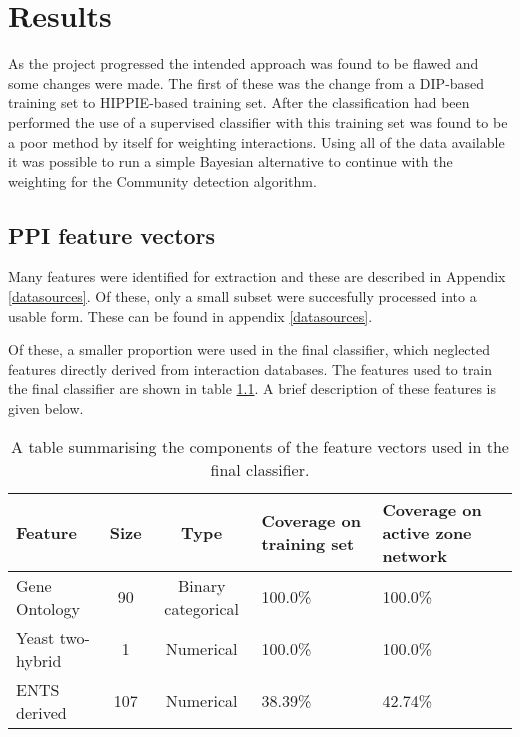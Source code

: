 \chapter{Results}
\label{results}


As the project progressed the intended approach was found to be flawed and some changes were made.
The first of these was the change from a \ac{DIP}-based training set to \ac{HIPPIE}-based training set.
After the classification had been performed the use of a supervised classifier with this training set was found to be a poor method by itself for weighting interactions.
Using all of the data available it was possible to run a simple Bayesian alternative to continue with the weighting for the Community detection algorithm.

\section{\ac{PPI} feature vectors}

Many features were identified for extraction and these are described in Appendix \ref{datasources}.
Of these, only a small subset were succesfully processed into a usable form.
These can be found in appendix \ref{datasources}.

Of these, a smaller proportion were used in the final classifier, which neglected features directly derived from interaction databases.
The features used to train the final classifier are shown in table \ref{tab:features}.
A brief description of these features is given below.

\begin{table}
    \centering
    \small
    \begin{tabular}{l c c p{} p{}}
        Feature         &   Size &  Type                &  Coverage on training set &  Coverage on active zone network \\
        \hline
        Gene Ontology    &  90   &  Binary categorical  &  100.0\%                  & 100.0\%                          \\
        Yeast two-hybrid &  1    &  Numerical           &  100.0\%                  & 100.0\%                          \\
        ENTS derived     &  107  &  Numerical           &  38.39\%                  & 42.74\%                          \\
    \end{tabular}
    \caption{A table summarising the components of the feature vectors used in the final classifier.}
    \label{tab:features}
\end{table}

